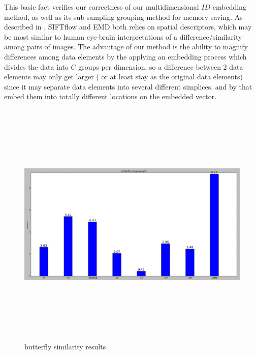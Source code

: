 		
This basic fact verifies our correctness of our multidimensional $ID$ embedding method, as well as its sub-sampling grouping method for memory saving.
As described in \cite{retargeting}, SIFTflow \cite{siftflow} and EMD \cite{EMD} both relies on spatial descriptors, which may be most similar to human eye-brain interpretations of a difference/similarity among pairs of images. The advantage of our method is the ability to magnify differences among data elements by the applying an embedding process which divides the data into $C$ groups per dimension, so a difference between 2 data elements may only get larger ( or at least stay as the original data elements) since it may separate data elements into several different simplices, and by that embed them into totally different locations on the embedded vector. \\
		
		
		\begin{figure}[h] \label{bf_id}
			\includegraphics[width=\linewidth,height=12cm,keepaspectratio]{Figures/bf_id}
			\caption[butterfly similarity results]
			{butterfly similarity results}
		\end{figure}
		
